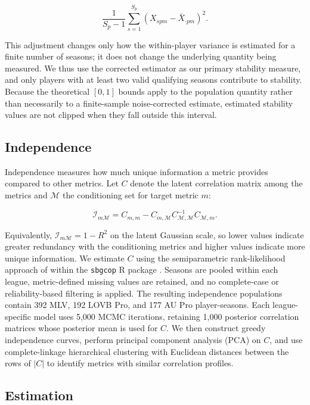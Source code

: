 \documentclass[
  12pt]{article}
\begin{document}
\[
\frac{1}{S_p-1}
\sum_{s=1}^{S_p}
\left(X_{spm}-\bar{X}_{\cdot pm}\right)^2.
\]

This adjustment changes only how the within-player variance is estimated
for a finite number of seasons; it does not change the underlying
quantity being measured. We thus use the corrected estimator as our
primary stability measure, and only players with at least two valid
qualifying seasons contribute to stability. Because the theoretical
\([0,1]\) bounds apply to the population quantity rather than
necessarily to a finite-sample noise-corrected estimate, estimated
stability values are not clipped when they fall outside this interval.

\subsection{Independence}\label{independence}

Independence measures how much unique information a metric provides
compared to other metrics. Let \(C\) denote the latent correlation
matrix among the metrics and \(\mathcal{M}\) the conditioning set for
target metric \(m\):

\[
\mathcal{I}_{m\mathcal{M}}
=
C_{m,m}
-
C_{m,\mathcal{M}}
C_{\mathcal{M},\mathcal{M}}^{-1}
C_{\mathcal{M},m}.
\]

Equivalently, \(\mathcal{I}_{m\mathcal{M}}=1-R^2\) on the latent
Gaussian scale, so lower values indicate greater redundancy with the
conditioning metrics and higher values indicate more unique information.
We estimate \(C\) using the semiparametric rank-likelihood approach of
\citet{hoff_extending_2007} within the \texttt{sbgcop} R package
\citep{hoff_sbgcop_2012}. Seasons are pooled within each league,
metric-defined missing values are retained, and no complete-case or
reliability-based filtering is applied. The resulting independence
populations contain 392 MLV, 192 LOVB Pro, and 177 AU Pro
player-seasons. Each league-specific model uses 5,000 MCMC iterations,
retaining 1,000 posterior correlation matrices whose posterior mean is
used for \(C\). We then construct greedy independence curves, perform
principal component analysis (PCA) on \(C\), and use complete-linkage
hierarchical clustering with Euclidean distances between the rows of
\(|C|\) to identify metrics with similar correlation profiles.

\subsection{Estimation}\label{estimation}
\end{document}
